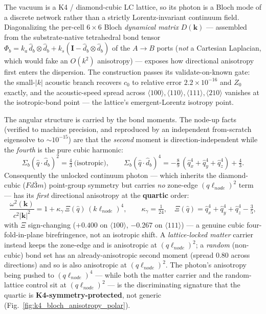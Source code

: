 The vacuum is a K4 / diamond-cubic LC lattice, so its photon is a Bloch mode of a discrete network rather than a strictly Lorentz-invariant continuum field. Diagonalizing the per-cell $6\times6$ Bloch \emph{dynamical matrix} $D(\mathbf k)$ --- assembled from the substrate-native tetrahedral bond tensor $\Phi_b=k_a\,\hat d_b\otimes\hat d_b+k_s(\mathbf I-\hat d_b\otimes\hat d_b)$ of the $A\!\to\!B$ ports (\emph{not} a Cartesian Laplacian, which would fake an $O(k^2)$ anisotropy) --- exposes how directional anisotropy first enters the dispersion. The construction passes its validate-on-known gate: the small-$|k|$ acoustic branch recovers $c_0$ to relative error $2.2\times10^{-16}$ and $Z_0$ exactly, and the acoustic-speed spread across $\langle100\rangle,\langle110\rangle,\langle111\rangle,\langle210\rangle$ vanishes at the isotropic-bond point --- the lattice's emergent-Lorentz isotropy point.

The angular structure is carried by the bond moments. The node-up facts (verified to machine precision, and reproduced by an independent from-scratch eigensolve to $\sim10^{-15}$) are that the \emph{second} moment is direction-independent while the \emph{fourth} is the pure cubic harmonic:
\begin{equation}
\Sigma_b(\hat q\cdot\hat d_b)^2 = \tfrac43\ \text{(isotropic)},\qquad
\Sigma_b(\hat q\cdot\hat d_b)^4 = -\tfrac89\,(\hat q_x^4+\hat q_y^4+\hat q_z^4)+\tfrac43 .
\end{equation}
Consequently the unlocked continuum photon --- which inherits the diamond-cubic ($Fd\bar3m$) point-group symmetry but carries \emph{no} zone-edge $(q\ell_{node})^2$ term --- has its \emph{first} directional anisotropy at the \textbf{quartic} order:
\begin{equation}
\frac{\omega^2(\mathbf k)}{c^2|\mathbf k|^2}=1+\kappa_\gamma\,\Xi(\hat q)\,(k\ell_{node})^4,\qquad
\kappa_\gamma=\tfrac1{24},\quad \Xi(\hat q)=\hat q_x^4+\hat q_y^4+\hat q_z^4-\tfrac35,
\end{equation}
with $\Xi$ sign-changing ($+0.400$ on $\langle100\rangle$, $-0.267$ on $\langle111\rangle$) --- a genuine cubic four-fold-in-plane birefringence, not an isotropic shift. A \emph{lattice-locked matter} carrier instead keeps the zone-edge and is anisotropic at $(q\ell_{node})^2$; a \emph{random} (non-cubic) bond set has an already-anisotropic second moment (spread $0.80$ across directions) and so is also anisotropic at $(q\ell_{node})^2$. The photon's anisotropy being pushed to $(q\ell_{node})^4$ --- while both the matter carrier and the random-lattice control sit at $(q\ell_{node})^2$ --- is the discriminating signature that the quartic is \textbf{K4-symmetry-protected}, not generic (Fig.~\ref{fig:k4_bloch_anisotropy_polar}).

